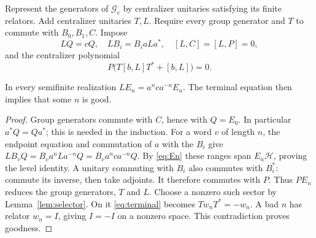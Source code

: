 Represent the generators of $\mathcal G_e$ by centralizer unitaries satisfying
its finite relators. Add centralizer unitaries $T,L$.
Require every group generator and $T$ to commute with $B_0,B_1,C$.
Impose
\begin{equation}\label{eq:reader19}
 LQ=cQ,\quad LB_i=B_i aLa^*,\quad [L,C]=[L,P]=0,
\end{equation}
and the centralizer polynomial
\begin{equation}\label{eq:terminal}
 P\bigl(T[b,L]T^*+[b,L]\bigr)=0.
\end{equation}
\begin{lemma}\label{lem:reader}
In every semifinite realization $LE_n=a^nca^{-n}E_n$.
The terminal equation then implies that some $n$ is good.
\end{lemma}
\begin{proof}
Group generators commute with $C$, hence with $Q=E_0$.
In particular $a^*Q=Qa^*$; this is needed in the induction.
For a word $v$ of length $n$, the endpoint equation and commutation
of $a$ with the $B_i$ give
$LB_vQ=B_v a^nLa^{-n}Q=B_va^nca^{-n}Q$.
By \eqref{eq:En} these ranges span $E_n\mathcal H$, proving the level identity.
A unitary commuting with $B_i$ also commutes with $B_i^*$: commute
its inverse, then take adjoints. It therefore commutes with $P$.
Thus $PE_n$ reduces the group generators, $T$ and $L$.
Choose a nonzero such sector by Lemma~\ref{lem:selector}.
On it \eqref{eq:terminal} becomes $Tw_nT^*=-w_n$.
A bad $n$ has relator $w_n=I$, giving $I=-I$ on a nonzero space.
This contradiction proves goodness.
\end{proof}

